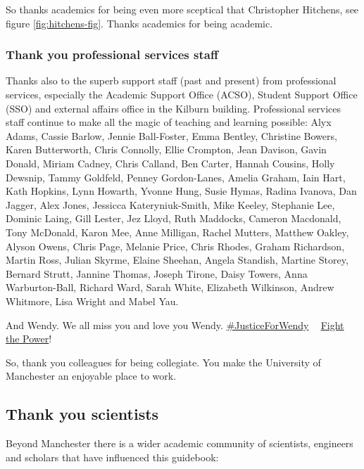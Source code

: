 \documentclass[
]{book}
\begin{document}
So thanks academics for being even more sceptical that Christopher Hitchens, see figure \ref{fig:hitchens-fig}. Thanks academics for being academic. 🙏

\hypertarget{psstaff}{%
\subsubsection{Thank you professional services staff}\label{psstaff}}

Thanks also to the superb support staff (past and present) from professional services, especially the Academic Support Office (ACSO), Student Support Office (SSO) and external affairs office in the Kilburn building. Professional services staff continue to make all the magic of teaching and learning possible: Alyx Adams, Cassie Barlow, Jennie Ball-Foster, Emma Bentley, Christine Bowers, Karen Butterworth, Chris Connolly, Ellie Crompton, Jean Davison, Gavin Donald, Miriam Cadney, Chris Calland, Ben Carter, Hannah Cousins, Holly Dewsnip, Tammy Goldfeld, Penney Gordon-Lanes, Amelia Graham, Iain Hart, Kath Hopkins, Lynn Howarth, Yvonne Hung, Susie Hymas, Radina Ivanova, Dan Jagger, Alex Jones, Jessicca Kateryniuk-Smith, Mike Keeley, Stephanie Lee, Dominic Laing, Gill Lester, Jez Lloyd, Ruth Maddocks, Cameron Macdonald, Tony McDonald, Karon Mee, Anne Milligan, Rachel Mutters, Matthew Oakley, Alyson Owens, Chris Page, Melanie Price, Chris Rhodes, Graham Richardson, Martin Ross, Julian Skyrme, Elaine Sheehan, Angela Standish, Martine Storey, Bernard Strutt, Jannine Thomas, Joseph Tirone, Daisy Towers, Anna Warburton-Ball, Richard Ward, Sarah White, Elizabeth Wilkinson, Andrew Whitmore, Lisa Wright and Mabel Yau.

And Wendy. We all miss you and love you Wendy. \href{https://www.justgiving.com/crowdfunding/byte-cafe}{\#JusticeForWendy} ✊🏽 \href{https://en.wikipedia.org/wiki/Fight_the_Power_(Public_Enemy_song)}{Fight the Power}! ✊🏽 \citep{fightthepower}

So, thank you colleagues for being collegiate. You make the University of Manchester an enjoyable place to work. 🙏

\hypertarget{scientists}{%
\subsection{Thank you scientists}\label{scientists}}

Beyond Manchester there is a wider academic community of scientists, engineers and scholars that have influenced this guidebook:
\end{document}
